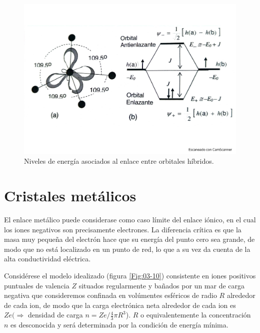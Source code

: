 \begin{figure}[h!] \centering
    \includegraphics[scale=0.5]{Cuerpo/Ch_03/Fotos libro 8.pdf}
    \caption{Niveles de energía asociados al enlace entre orbitales híbridos.}
    \label{Fig:03-09}
\end{figure}    

\section{Cristales metálicos}

El enlace metálico puede considerase como caso límite del enlace iónico, en el cual los iones negativos son precisamente electrones. La diferencia crítica es que la masa muy pequeña del electrón hace que su energía del punto cero sea grande, de modo que no está localizado en un punto de red, lo que a su vez da cuenta de la alta conductividad eléctrica. 

Considérese el modelo idealizado (figura \ref{Fig:03-10}) consistente en iones positivos puntuales de valencia $Z$ situados regularmente y bañados por un mar de carga negativa que consideremos confinada en volúmentes esféricos de radio $R$ alrededor de cada ion, de modo que la carga electrónica neta alrededor de cada ion es $Ze(\Rightarrow$ densidad de carga $n=Ze/\frac{4}{3}\pi R^3$). $R$ o equivalentemente la concentración $n$ es desconocida y será determinada por la condición de energía mínima. 



